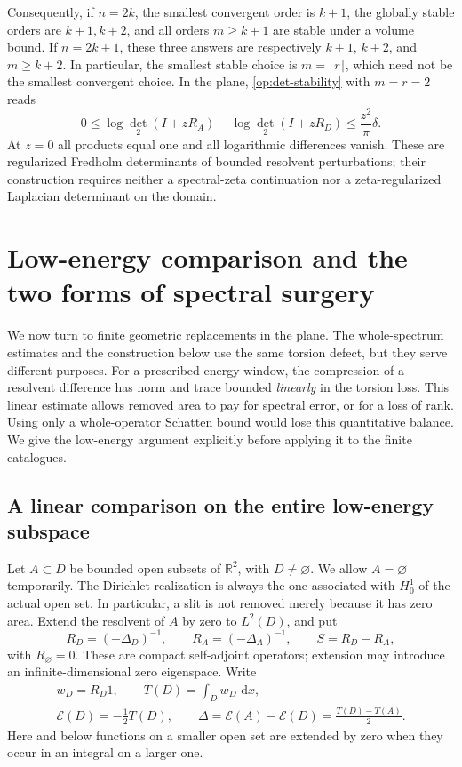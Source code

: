 \documentclass[11pt,reqno]{amsart}
\numberwithin{equation}{section}
\newcommand{\R}{\mathbb R}
\newcommand{\dd}{\,\mathrm d}
\begin{document}
Consequently, if $n=2k$, the smallest convergent order is $k+1$,
the globally stable orders are $k+1,k+2$, and all orders $m\ge k+1$
are stable under a volume bound.  If $n=2k+1$, these three answers
are respectively $k+1$, $k+2$, and $m\ge k+2$.
In particular, the smallest stable choice is $m=\lceil r\rceil$,
which need not be the smallest convergent choice.  In the plane,
\eqref{op:det-stability} with $m=r=2$ reads
\begin{equation}\label{op:planar-det}
 0\le\log\det_2(I+zR_A)-\log\det_2(I+zR_D)
       \le\frac{z^2}{\pi}\delta.
\end{equation}
At $z=0$ all products equal one and all logarithmic differences
vanish.  These are regularized Fredholm determinants of bounded
resolvent perturbations; their construction requires neither a
spectral-zeta continuation nor a zeta-regularized Laplacian
determinant on the domain.



\section{Low-energy comparison and the two forms of spectral surgery}
\label{surgery:resolvents}

We now turn to finite geometric replacements in the plane.  The
whole-spectrum estimates and the construction below use the same
torsion defect, but they serve different purposes.  For a prescribed
energy window, the compression of a resolvent difference has norm and
trace bounded \emph{linearly} in the torsion loss.  This linear estimate
allows removed area to pay for spectral error, or for a loss of rank.
Using only a whole-operator Schatten bound would lose this quantitative
balance.  We give the low-energy argument explicitly before applying it
to the finite catalogues.

\subsection{A linear comparison on the entire low-energy subspace}

Let \(A\subset D\) be bounded open subsets of \(\R^2\), with \(D\ne
\varnothing\).  We allow \(A=\varnothing\) temporarily.  The Dirichlet
realization is always the one associated with \(H^1_0\) of the actual
open set.  In particular, a slit is not removed merely because it has
zero area.  Extend the resolvent of \(A\) by zero to \(L^2(D)\), and put
\[
 R_D=(-\Delta_D)^{-1},\qquad R_A=(-\Delta_A)^{-1},\qquad
 S=R_D-R_A,
\]
with \(R_\varnothing=0\).  These are compact self-adjoint operators;
extension may introduce an infinite-dimensional zero eigenspace.
Write
\begin{equation}
 \begin{gathered}
 w_D=R_D1,\qquad T(D)=\int_D w_D\,\dd x,\\
 \mathcal E(D)=-\frac12T(D),\qquad
 \Delta=\mathcal E(A)-\mathcal E(D)
        =\frac{T(D)-T(A)}2.
 \end{gathered}
 \label{surgery:torsion}
\end{equation}
Here and below functions on a smaller open set are extended by zero
when they occur in an integral on a larger one.
\end{document}
